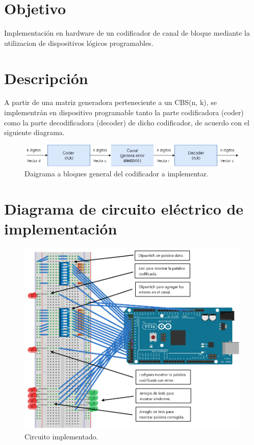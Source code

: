 \documentclass[12pt,letterpaper]{article}
\begin{document}

\newpage
\tableofcontents
\listoffigures

\newpage
\section{Objetivo}
Implementación en hardware de un codificador de canal de bloque mediante la utilizacion 
de dispositivos lógicos programables.

\section{Descripción}
A partir de una matriz generadora perteneciente a un CBS(n, k), se implementrán en dispositivo 
programable tanto la parte codificadora (coder) como la parte decodificadora (decoder) de dicho
codificador, de acuerdo con el siguiente diagrama.
\begin{figure}[ht]
    \centering
    \includegraphics[width=1\textwidth]{d0.png}
    \caption{Daigrama a bloques general del codificador a implementar.}
\end{figure}

\newpage
\section{Diagrama de circuito eléctrico de implementación}
\begin{figure}[ht]
    \centering
    \includegraphics[width=.75\textwidth]{circ.png}
    \caption{Circuito implementado.}
\end{figure}
\end{document}
